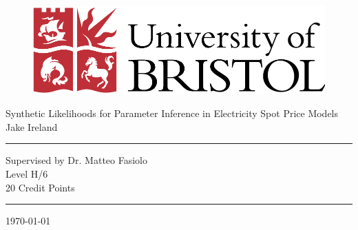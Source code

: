 \documentclass[12pt]{article}
\begin{document}
\thispagestyle{empty}

\begin{singlespacing}
\begin{figure}[h]
\begin{center}
\includegraphics[scale=0.5]{uob.pdf} %
\end{center}
\end{figure}

\begin{center}
{\Large Synthetic Likelihoods for Parameter Inference in Electricity Spot Price Models \\ \vspace{1cm}Jake Ireland}
\end{center}

\vspace{3cm}
\hrule
\vspace{0.3cm}
\begin{center}
Supervised by Dr. Matteo Fasiolo\\
Level H/6\\
20 Credit Points
\end{center}
\vspace{0.5cm}
\hrule

\vspace{3cm}
\begin{center}
\today
\end{center}
\end{singlespacing}
\end{document}
